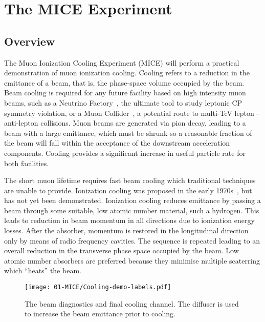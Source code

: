 \section{The MICE Experiment}
\label{sec:MICE}
  \subsection{Overview}
  \label{subsec:Overview}
  The Muon Ionization Cooling Experiment (MICE) will perform a practical demonstration of muon ionization cooling. Cooling refers to a reduction in the emittance of a beam, that is, the phase-space volume occupied by the beam. Beam cooling is required for any future facility based on high intensity muon beams, such as a Neutrino Factory~\cite{ISS-Physics}, the ultimate tool to study leptonic CP symmetry violation, or a Muon Collider~\cite{MC_Overview}, a potential route to multi-TeV lepton - anti-lepton collisions. Muon beams are generated via pion decay, leading to a beam with a large emittance, which must be shrunk so a reasonable fraction of the beam will fall within the acceptance of the downstream acceleration components. Cooling provides a significant increase in useful particle rate for both facilities.

  The short muon lifetime requires fast beam cooling which traditional techniques are unable to provide.  Ionization cooling was proposed in the early 1970s~\cite{Skrinsky, Neuffer}, but has not yet been demonstrated.  Ionization cooling reduces emittance by passing a beam through some suitable, low atomic number material, such a hydrogen.  This leads to reduction in beam momentum in all directions due to ionization energy losses.  After the absorber, momentum is restored in the longitudinal direction only by means of radio frequency cavities.  The sequence is repeated leading to an overall reduction in the transverse phase space occupied by the beam. Low atomic number absorbers are preferred because they minimise multiple scaterring which ``heats'' the beam.

  \begin{figure}[bht]
    \begin{center}
      \texttt{[image: 01-MICE/Cooling-demo-labels.pdf]}
      \caption{\label{fig:CoolingChannel} The beam diagnostics and final cooling channel. The diffuser is used to increase the beam emittance prior to cooling.}
    \end{center}
  \end{figure}

